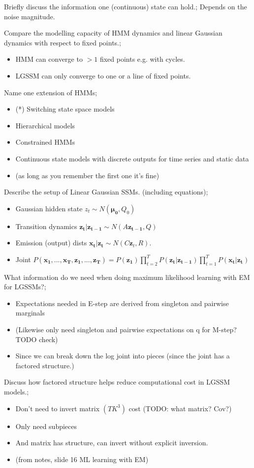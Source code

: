 \documentclass{article}
\begin{document}
Briefly discuss the  information one (continuous) state can hold.; Depends on the noise magnitude. 

Compare the modelling capacity of HMM dynamics and linear Gaussian dynamics with respect to fixed points.; \begin{itemize} \item HMM can converge to $>1$ fixed points e.g. with cycles.  \item LGSSM can only converge to one or a line of fixed points.  \end{itemize}

Name one extension of HMMs; \begin{itemize} \item (*) Switching state space models \item Hierarchical models \item Constrained HMMs \item Continuous state models with discrete outputs for time series and static data \item (as long as you remember the first one it's fine) \end{itemize}

Describe the setup of Linear Gaussian SSMs. (including equations); \begin{itemize} \item Gaussian hidden state $z_t \sim N(\mathbf{\mu_0}, Q_0)$ \item Transition dynamics $\mathbf{z_t|z_{t-1}}\sim  N(A\mathbf{z_{t-1}}, Q)$ \item Emission (output) dists $\mathbf{x_t|z_t}\sim N(C\mathbf{z}_t, R)$.  \item Joint $P(\mathbf{x_1,...,x_T,z_1,...,z_T})=P(\mathbf{z_1})\prod_{t=2}^T P(\mathbf{z_t|z_{t-1}})\prod_{t=1}^T P(\mathbf{x_t|z_t})$ \end{itemize}

What information do we need when doing maximum likelihood learning with EM for LGSSMs?; \begin{itemize} \item Expectations needed in E-step are derived from singleton and pairwise marginals \item (Likewise only need singleton and pairwise expectations on q for M-step? TODO check) \item Since we can break down the log joint into pieces (since the joint has a factored structure.) \end{itemize}

Discuss how factored structure helps reduce computational cost in LGSSM models.; \begin{itemize} \item Don't need to invert matrix $(TK^3)$ cost (TODO: what matrix? Cov?) \item Only need subpieces \item And matrix has structure, can invert without explicit inversion. \item (from notes, slide 16 ML learning with EM) \end{itemize}
\end{document}

